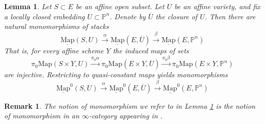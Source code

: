 \documentclass[11pt,letterpaper]{amsart}
\newtheorem{lemma}[dummy]{Lemma}
\newtheorem{remark}[dummy]{Remark}
\newcommand{\bP}{\mathbb{P}}
\newcommand{\Map}[2]{\underline{\mathrm{Map}}\left (#1,#2\right )}
\newcommand{\Mapo}[2]{\underline{\mathrm{Map}}^{0}\left (#1,#2\right )}
\begin{document}
\begin{lemma}
\label{extension}
Let  $S \subset E$ be an affine open subset. Let $U$ be an affine variety, and fix a locally closed embedding $U \subset \mathbb{P}^n$. Denote by $\overline{U}$ the closure of $U$. Then there are natural monomorphisms of stacks
$$
\Map{S}{U} \stackrel{\alpha}\longrightarrow \Map{E}{\overline{U}} \stackrel{\beta}\longrightarrow \Map{E}{\bP^n}
$$
That is, for every affine scheme $Y$ the induced  maps of sets
$$
\pi_0 \mathrm{Map}(S\times Y,U)   \stackrel{\pi_0\alpha} \to \pi_0 \mathrm{Map}(E\times Y, \overline{U})  \stackrel{\pi_0\beta}  \to \pi_0\mathrm{Map}(E\times Y, \bP^n)
$$
are injective. Restricting to quasi-constant maps yields monomorphisms
$$
\Mapo{S}{U} \stackrel{\alpha}\longrightarrow \Mapo{E}{\overline{U}}  \stackrel{\beta}\longrightarrow \Mapo{E}{\bP^n}
$$
\end{lemma}
\begin{remark}
The notion of monomorphism we refer to in Lemma \ref{extension} is the notion of monomorphism in an $\infty$-category appearing in \cite[p.~575]{HTT}.
\end{remark}
\end{document}
